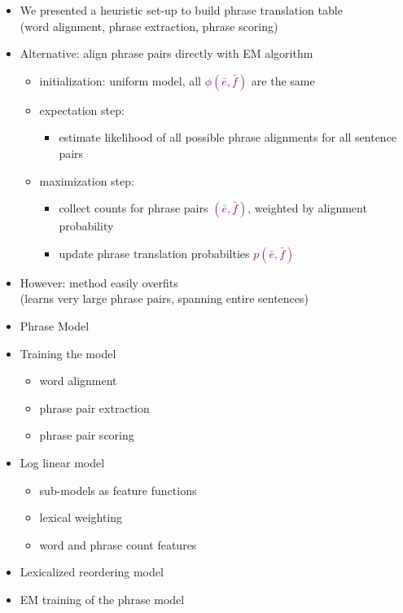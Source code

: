 \documentclass[landscape]{slides}
\newcommand{\maths}[1]{\textcolor{purple}{#1}}
\begin{document}

\begin{itemize}
\item We presented a heuristic set-up to build phrase translation table\\
(word alignment, phrase extraction, phrase scoring)
\item Alternative: align phrase pairs directly with EM algorithm
\begin{itemize}
\item initialization: uniform model, all \maths{$\phi(\bar{e},\bar{f})$} are the same
\item expectation step:
\begin{itemize}
\item estimate likelihood of all possible phrase alignments for all sentence pairs
\end{itemize}
\item maximization step:
\begin{itemize}
\item collect counts for phrase pairs \maths{$(\bar{e},\bar{f})$}, weighted by alignment probability
\item update phrase translation probabilties \maths{$p(\bar{e},\bar{f})$}
\end{itemize}
\end{itemize}
\item However: method easily overfits\\ (learns very large phrase pairs, spanning entire sentences)
\end{itemize}


\begin{itemize} \itemsep -1pt
\item Phrase Model
\item Training the model
\begin{itemize}
\item word alignment
\item phrase pair extraction
\item phrase pair scoring
\end{itemize}
\item Log linear model
\begin{itemize}
\item sub-models as feature functions
\item lexical weighting
\item word and phrase count features
\end{itemize}
\item Lexicalized reordering model
\item EM training of the phrase model
\end{itemize}

\end{document}
